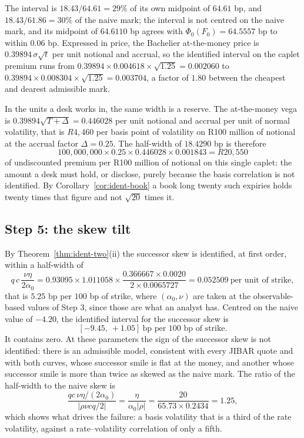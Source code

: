 \documentclass[../../../main.tex]{subfiles}
\begin{document}
The interval is $18.43/64.61=29\%$ of its own midpoint of $64.61$ bp, and $18.43/61.86=30\%$ of the naive mark; the interval is not centred on the naive mark, and its midpoint of $64.6110$ bp agrees with $\Phi_0(F_0)=64.5557$ bp to within $0.06$ bp. Expressed in price, the Bachelier at-the-money price is $0.39894\,\sigma\sqrt{t}$ per unit notional and accrual, so the identified interval on the caplet premium runs from $0.39894\times0.004618\times\sqrt{1.25}=0.002060$ to $0.39894\times0.008304\times\sqrt{1.25}=0.003704$, a factor of $1.80$ between the cheapest and dearest admissible mark.

In the units a desk works in, the same width is a reserve. The at-the-money vega is $0.39894\sqrt{T+\Delta}=0.446028$ per unit notional and accrual per unit of normal volatility, that is $R4{,}460$ per basis point of volatility on R100 million of notional at the accrual factor $\Delta=0.25$. The half-width of $18.4290$ bp is therefore
\[
100{,}000{,}000\times0.25\times0.446028\times0.001843=R20{,}550
\]
of undiscounted premium per R100 million of notional on this single caplet: the amount a desk must hold, or disclose, purely because the basis correlation is not identified. By Corollary~\ref{cor:ident-book} a book long twenty such expiries holds twenty times that figure and not $\sqrt{20}$ times it.

\subsection{Step 5: the skew tilt}

By Theorem~\ref{thm:ident-two}(ii) the successor skew is identified, at first order, within a half-width of
\[
q\,c\,\frac{\nu\eta}{2\alpha_0}=0.93095\times1.011058\times\frac{0.366667\times0.0020}{2\times0.0065727}=0.052509\ \text{per unit of strike},
\]
that is $5.25$ bp per $100$ bp of strike, where $(\alpha_0,\nu)$ are taken at the observable-based values of Step 3, since those are what an analyst has. Centred on the naive value of $-4.20$, the identified interval for the successor skew is
\[
[-9.45,\ +1.05]\ \text{bp per }100\text{ bp of strike}.
\]
It contains zero. At these parameters the sign of the successor skew is not identified: there is an admissible model, consistent with every JIBAR quote and with both curves, whose successor smile is flat at the money, and another whose successor smile is more than twice as skewed as the naive mark. The ratio of the half-width to the naive skew is
\[
\frac{q c\,\nu\eta/(2\alpha_0)}{|{\rho\nu c q}/2|}=\frac{\eta}{\alpha_0|\rho|}=\frac{20}{65.73\times0.2434}=1.25,
\]
which shows what drives the failure: a basis volatility that is a third of the rate volatility, against a rate--volatility correlation of only a fifth.
\end{document}
